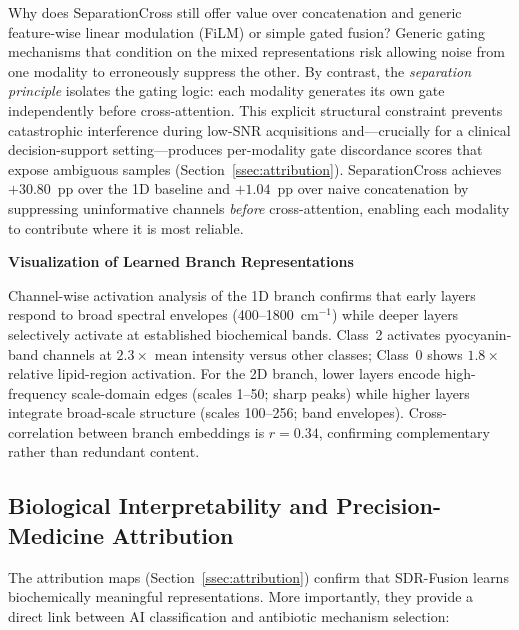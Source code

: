 \documentclass[preprint,12pt]{elsarticle}
\begin{document}
Why does SeparationCross still offer value over concatenation and
generic feature-wise linear modulation (FiLM) or simple gated fusion?
Generic gating mechanisms that condition on the mixed representations
risk allowing noise from one modality to erroneously suppress the
other. By contrast, the \emph{separation principle} isolates the
gating logic: each modality generates its own gate independently
before cross-attention. This explicit structural constraint prevents
catastrophic interference during low-SNR acquisitions and---crucially
for a clinical decision-support setting---produces per-modality gate
discordance scores that expose ambiguous samples
(Section~\ref{ssec:attribution}). SeparationCross achieves $+30.80$~pp
over the 1D baseline and $+1.04$~pp over naive concatenation by
suppressing uninformative channels \emph{before} cross-attention,
enabling each modality to contribute where it is most reliable.

\textbf{Visualization of Learned Branch Representations}
\label{ssec:activation}

Channel-wise activation analysis of the 1D branch confirms that early
layers respond to broad spectral envelopes (400--1800~cm$^{-1}$) while
deeper layers selectively activate at established biochemical bands.
Class~2 activates pyocyanin-band channels at $2.3\times$ mean
intensity versus other classes; Class~0 shows $1.8\times$ relative
lipid-region activation. For the 2D branch, lower layers encode
high-frequency scale-domain edges (scales 1--50; sharp peaks) while
higher layers integrate broad-scale structure (scales 100--256; band
envelopes). Cross-correlation between branch embeddings is $r{=}0.34$,
confirming complementary rather than redundant content.

\subsection{Biological Interpretability and Precision-Medicine
Attribution}
\label{ssec:bio}

The attribution maps (Section~\ref{ssec:attribution}) confirm that
SDR-Fusion learns biochemically meaningful representations. More
importantly, they provide a direct link between AI classification and
antibiotic mechanism selection:
\end{document}
